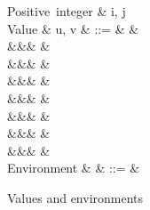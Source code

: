 \begin{figure}[H]
\begin{syntaxfig}
\mbox{Positive integer}
&
i, j
\\[2mm]
\mbox{Value}
&
u, v
&
::=
&
\exTrue \mid \exFalse
&
\\
&&&
&
\\
&&&
\exNil
&
\\
&&&
&
\\
&&&
&
\\
&&&
&
\\
&&&
&
\\
&&&
&
\\[2mm]
\mbox{Environment}
&
\rho
&
::=
&
\end{syntaxfig}
\caption{Values and environments}
\label{fig:core-syntax-value}
\end{figure}

